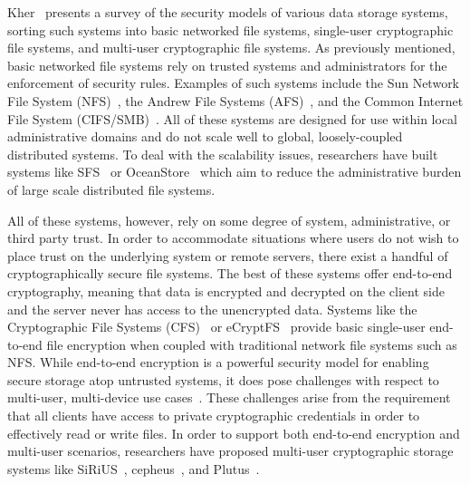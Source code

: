 Kher~\cite{kher2005} presents a survey of the security models of
various data storage systems, sorting such systems into basic
networked file systems, single-user cryptographic file systems, and
multi-user cryptographic file systems. As previously mentioned, basic
networked file systems rely on trusted systems and administrators for
the enforcement of security rules. Examples of such systems include
the Sun Network File System (NFS)~\cite{sandberg1985}, the Andrew File
Systems (AFS)~\cite{howard1988}, and the Common Internet File System
(CIFS/SMB)~\cite{microsoft-smb2}. All of these systems are designed
for use within local administrative domains and do not scale well to
global, loosely-coupled distributed systems. To deal with the
scalability issues, researchers have built systems like
SFS~\cite{mazieres1999} or OceanStore~\cite{kubiatowicz2000} which aim
to reduce the administrative burden of large scale distributed file
systems.

All of these systems, however, rely on some degree of system,
administrative, or third party trust. In order to accommodate
situations where users do not wish to place trust on the underlying
system or remote servers, there exist a handful of cryptographically
secure file systems. The best of these systems offer end-to-end
cryptography, meaning that data is encrypted and decrypted on the
client side and the server never has access to the unencrypted data.
Systems like the Cryptographic File Systems (CFS)~\cite{blaze1993} or
eCryptFS~\cite{ecryptfs} provide basic single-user end-to-end file
encryption when coupled with traditional network file systems such as
NFS. While end-to-end encryption is a powerful security model for
enabling secure storage atop untrusted systems, it does pose
challenges with respect to multi-user, multi-device use
cases~\cite{miltchev2008}. These challenges arise from the requirement
that all clients have access to private cryptographic credentials in
order to effectively read or write files. In order to support both
end-to-end encryption and multi-user scenarios, researchers have
proposed multi-user cryptographic storage systems like
SiRiUS~\cite{goh2003}, cepheus~\cite{fu1998}, and
Plutus~\cite{kallahalla2003}.

